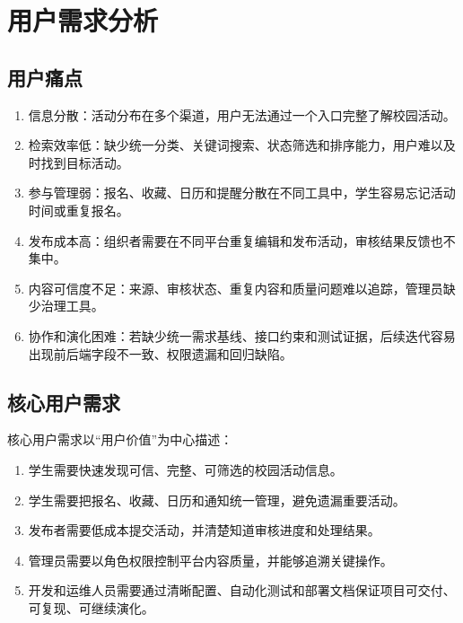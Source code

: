 \documentclass[12pt,a4paper]{ctexart}
\begin{document}
  \section{用户需求分析}
  \subsection{用户痛点}
  \begin{enumerate}
  \item 信息分散：活动分布在多个渠道，用户无法通过一个入口完整了解校园活动。
  \item 检索效率低：缺少统一分类、关键词搜索、状态筛选和排序能力，用户难以及时找到目标活动。
  \item 参与管理弱：报名、收藏、日历和提醒分散在不同工具中，学生容易忘记活动时间或重复报名。
  \item 发布成本高：组织者需要在不同平台重复编辑和发布活动，审核结果反馈也不集中。
  \item 内容可信度不足：来源、审核状态、重复内容和质量问题难以追踪，管理员缺少治理工具。
  \item 协作和演化困难：若缺少统一需求基线、接口约束和测试证据，后续迭代容易出现前后端字段不一致、权限遗漏和回归缺陷。
  \end{enumerate}

  \subsection{核心用户需求}
  核心用户需求以“用户价值”为中心描述：
  \begin{enumerate}
  \item 学生需要快速发现可信、完整、可筛选的校园活动信息。
  \item 学生需要把报名、收藏、日历和通知统一管理，避免遗漏重要活动。
  \item 发布者需要低成本提交活动，并清楚知道审核进度和处理结果。
  \item 管理员需要以角色权限控制平台内容质量，并能够追溯关键操作。
  \item 开发和运维人员需要通过清晰配置、自动化测试和部署文档保证项目可交付、可复现、可继续演化。
  \end{enumerate}
\end{document}
